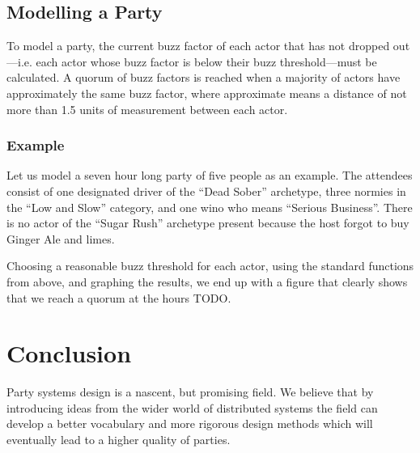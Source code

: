 \documentclass[twocolumn]{article}
\begin{document}
\subsection{Modelling a Party}

To model a party, the current buzz factor of each actor that has not dropped
out—i.e. each actor whose buzz factor is below their buzz threshold—must be
calculated. A quorum of buzz factors is reached when a majority of actors have
approximately the same buzz factor, where approximate means a distance of not
more than 1.5 units of measurement between each actor.

\subsubsection{Example}

Let us model a seven hour long party of five people as an example. The attendees
consist of one designated driver of the “Dead Sober” archetype, three normies in
the “Low and Slow” category, and one wino who means “Serious Business”. There is
no actor of the “Sugar Rush” archetype present because the host forgot to buy
Ginger Ale and limes.

Choosing a reasonable buzz threshold for each actor, using the standard
functions from above, and graphing the results, we end up with a figure that
clearly shows that we reach a quorum at the hours TODO.


\section{Conclusion}

Party systems design is a nascent, but promising field. We believe that by
introducing ideas from the wider world of distributed systems the field can
develop a better vocabulary and more rigorous design methods which will
eventually lead to a higher quality of parties.
\end{document}
